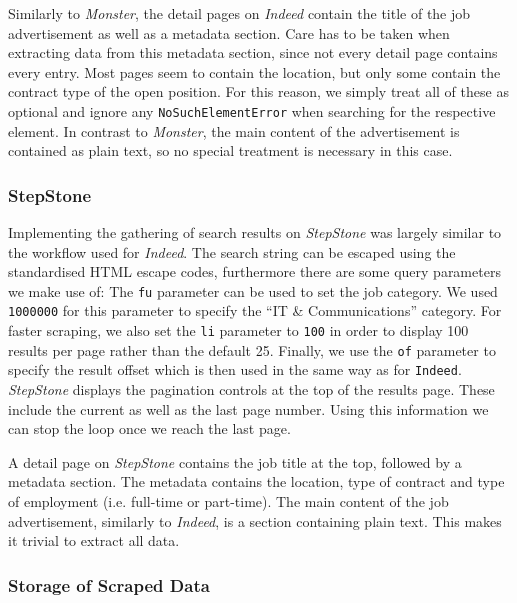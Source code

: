 \documentclass[runningheads]{llncs}
\begin{document}
Similarly to \textit{Monster}, the detail pages on \textit{Indeed} contain the title of the job advertisement as well as a metadata section. Care has to be taken when extracting data from this metadata section, since not every detail page contains every entry. Most pages seem to contain the location, but only some contain the contract type of the open position. For this reason, we simply treat all of these as optional and ignore any \texttt{NoSuchElementError} when searching for the respective element. In contrast to \textit{Monster}, the main content of the advertisement is contained as plain text, so no special treatment is necessary in this case.

\subsubsection{StepStone}
\label{subsub:stepstone}

Implementing the gathering of search results on \textit{StepStone} \cite{stepstone} was largely similar to the workflow used for \textit{Indeed}. The search string can be escaped using the standardised HTML escape codes, furthermore there are some query parameters we make use of: The \texttt{fu} parameter can be used to set the job category. We used \texttt{1000000} for this parameter to specify the “IT \& Communications” category. For faster scraping, we also set the \texttt{li} parameter to \texttt{100} in order to display 100 results per page rather than the default 25. Finally, we use the \texttt{of} parameter to specify the result offset which is then used in the same way as for \texttt{Indeed}. \textit{StepStone} displays the pagination controls at the top of the results page. These include the current as well as the last page number. Using this information we can stop the loop once we reach the last page.

A detail page on \textit{StepStone} contains the job title at the top, followed by a metadata section. The metadata contains the location, type of contract and type of employment (i.e. full-time or part-time). The main content of the job advertisement, similarly to \textit{Indeed}, is a section containing plain text. This makes it trivial to extract all data.

\subsubsection{Storage of Scraped Data}
\label{subsub:storage_of_scraped_data}
\end{document}
